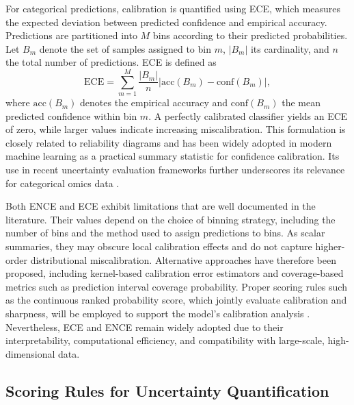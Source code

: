 For categorical predictions, calibration is quantified using ECE, which measures the expected deviation between predicted confidence and empirical accuracy. Predictions are partitioned into $M$ bins according to their predicted probabilities. Let $B_m$ denote the set of samples assigned to bin $m$, $|B_m|$ its cardinality, and $n$ the total number of predictions. ECE is defined as
\begin{equation}
\mathrm{ECE} = \sum_{m=1}^{M} \frac{|B_m|}{n} \left| \mathrm{acc}(B_m) - \mathrm{conf}(B_m) \right|,
\end{equation}
where $\mathrm{acc}(B_m)$ denotes the empirical accuracy and $\mathrm{conf}(B_m)$ the mean predicted confidence within bin $m$. A perfectly calibrated classifier yields an ECE of zero, while larger values indicate increasing miscalibration. This formulation is closely related to reliability diagrams and has been widely adopted in modern machine learning as a practical summary statistic for confidence calibration. Its use in recent uncertainty evaluation frameworks further underscores its relevance for categorical omics data \citep{Naeini2015}.

Both ENCE and ECE exhibit limitations that are well documented in the literature. Their values depend on the choice of binning strategy, including the number of bins and the method used to assign predictions to bins. As scalar summaries, they may obscure local calibration effects and do not capture higher-order distributional miscalibration. Alternative approaches have therefore been proposed, including kernel-based calibration error estimators and coverage-based metrics such as prediction interval coverage probability. Proper scoring rules such as the continuous ranked probability score, which jointly evaluate calibration and sharpness, will be employed to support the model's calibration analysis \citep{Kuleshov2018,Gneiting2007Scoring}. Nevertheless, ECE and ENCE remain widely adopted due to their interpretability, computational efficiency, and compatibility with large-scale, high-dimensional data.


\subsection{Scoring Rules for Uncertainty Quantification}

